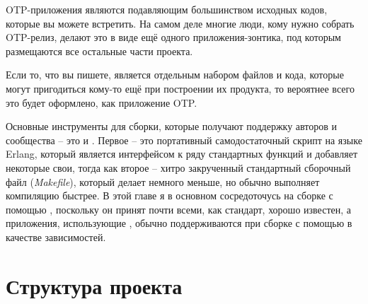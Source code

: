\documentclass[11pt, oneside]{book}   	%
\begin{document}
OTP-приложения являются подавляющим большинством исходных кодов, которые вы можете встретить. На самом деле многие люди, кому нужно собрать OTP-релиз, делают это в виде ещё одного приложения-зонтика, под которым размещаются все остальные части проекта.

Если то, что вы пишете, является отдельным набором файлов и кода, которые могут пригодиться кому-то ещё при построении их продукта, то вероятнее всего это будет оформлено, как приложение OTP.

Основные инструменты для сборки, которые получают поддержку авторов и сообщества -- это  и . Первое -- это портативный самодостаточный скрипт на языке Erlang, который является интерфейсом к ряду стандартных функций и добавляет некоторые свои, тогда как второе -- хитро закрученный стандартный сборочный файл (\emph{Makefile}), который делает немного меньше, но обычно выполняет компиляцию быстрее. В этой главе я в основном сосредоточусь на сборке с помощью , поскольку он принят почти всеми, как стандарт, хорошо известен, а приложения, использующие , обычно поддерживаются при сборке с помощью  в качестве зависимостей.


\section{Структура проекта}
\label{sec:project-structure}
\end{document}
